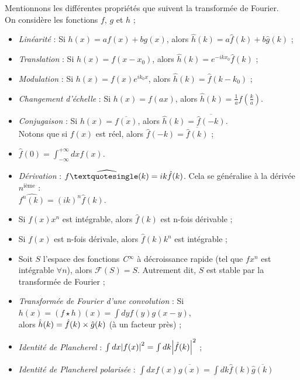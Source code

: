 \documentclass[../notesdecours.tex]{subfiles}
\begin{document}
\begin{Property}
Mentionnons les différentes propriétés que suivent la transformée de Fourier. \\
On considère les fonctions $f$, $g$ et $h$ ; 
\begin{itemize}[label = \textbullet]
\item \textit{Linéarité} : Si $h(x) = af(x) + bg(x)$, alors $\hat{h}(k) = a\hat{f}(k) + b\hat{g}(k)$ ;
\item \textit{Translation} : Si $h(x) = f(x-x_0)$, alors $\hat{h}(k) = e^{-ikx_0}\hat{f}(k)$ ; 
\item \textit{Modulation} : Si $h(x) = f(x) e^{ik_0 x}$, alors $\hat{h}(k) = \hat{f}(k-k_0)$ ;
\item \textit{Changement d'échelle} : Si $h(x) = f(ax)$, alors $\hat{h}(k) = \frac{1}{a}\hat{f}(\frac{k}{a})$.
\item \textit{Conjugaison} : Si $h(x) = \overline{f(x)}$, alors $\hat{h}(k) = \overline{\hat{f}(-k)}$. \\
Notons que si $f(x)$ est réel, alors $\hat{f}(-k) = \overline{\hat{f}(k)}$ ;
\item $\hat{f}(0) = \int_{-\infty}^{+\infty} dxf(x)$.
\item \textit{Dérivation} : $\widehat{f \textquotesingle (k)} =ik \hat{f}(k)$. Cela se généralise à la dérivée $n^{\mbox{ième}}$ : \\
$\widehat{f^n (k)} = (ik)^n \hat{f}(k)$. 
\item Si $f(x)x^n$ est intégrable, alors $\hat{f}(k)$ est n-fois dérivable ; 
\item Si $f(x)$ est n-fois dérivale, alors $\hat{f}(k)k^n$ est intégrable ; 
\item Soit $S$ l'espace des fonctions \textit{C}$^{\infty}$ à décroissance rapide (tel que $fx^n$ est intégrable $\forall n$), alors $\mathcal{F}(S) = S$. 
Autrement dit, $S$ est stable par la transformée de Fourier ;
\item \textit{Transformée de Fourier d'une convolution} : Si $h(x) = (f \star h)(x) = \int dy f(y)g(x-y)$, \\
alors $\hat{h}(k) = \hat{f}(k)\times\hat{g}(k)$ (à un facteur près) ;
\item \textit{Identité de Plancherel} : $\int dx \abs{f(x)}^2 = \int dk \abs{\hat{f}(k)}^2$ ; 
\item \textit{Identité de Plancherel polarisée} : $\int dx f(x)\overline{g(x)} = \int dk \hat{f}(k)\overline{\hat{g}(k)}$ 
\end{itemize}
\end{Property}
\end{document}
